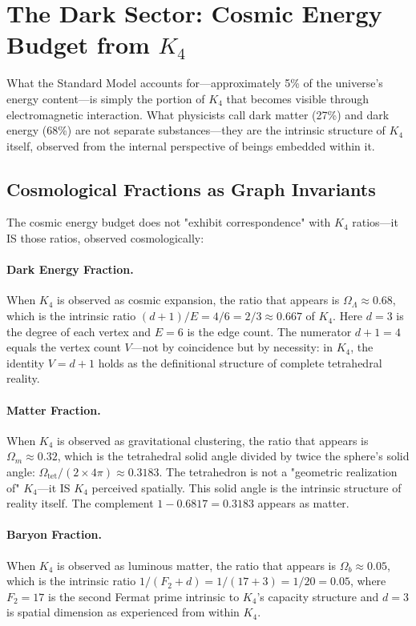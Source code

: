 \documentclass[11pt,a4paper]{book}
\begin{document}
\section{The Dark Sector: Cosmic Energy Budget from $K_4$}
\label{sec:dark-sectors}

What the Standard Model accounts for—approximately 5\% of the universe's energy content—is simply the portion of $K_4$ that becomes visible through electromagnetic interaction. What physicists call dark matter (27\%) and dark energy (68\%) are not separate substances—they are the intrinsic structure of $K_4$ itself, observed from the internal perspective of beings embedded within it.

\subsection{Cosmological Fractions as Graph Invariants}

The cosmic energy budget does not "exhibit correspondence" with $K_4$ ratios—it IS those ratios, observed cosmologically:

\paragraph{Dark Energy Fraction.}
When $K_4$ is observed as cosmic expansion, the ratio that appears is $\Omega_\Lambda \approx 0.68$, which is the intrinsic ratio $(d+1)/E = 4/6 = 2/3 \approx 0.667$ of $K_4$.
Here $d = 3$ is the degree of each vertex and $E = 6$ is the edge count.
The numerator $d + 1 = 4$ equals the vertex count $V$—not by coincidence but by necessity:
in $K_4$, the identity $V = d + 1$ holds as the definitional structure of complete tetrahedral reality.

\paragraph{Matter Fraction.}
When $K_4$ is observed as gravitational clustering, the ratio that appears is $\Omega_m \approx 0.32$, which is the tetrahedral solid angle divided by twice 
the sphere's solid angle: $\Omega_{\text{tet}}/(2 \times 4\pi) \approx 0.3183$.
The tetrahedron is not a "geometric realization of" $K_4$—it IS $K_4$ perceived spatially. This solid angle is 
the intrinsic structure of reality itself. The complement $1 - 0.6817 = 0.3183$ appears as matter.

\paragraph{Baryon Fraction.}
When $K_4$ is observed as luminous matter, the ratio that appears is $\Omega_b \approx 0.05$, which is the intrinsic ratio $1/(F_2 + d) = 1/(17 + 3) = 1/20 = 0.05$,
where $F_2 = 17$ is the second Fermat prime intrinsic to $K_4$'s capacity structure
and $d = 3$ is spatial dimension as experienced from within $K_4$.
\end{document}
